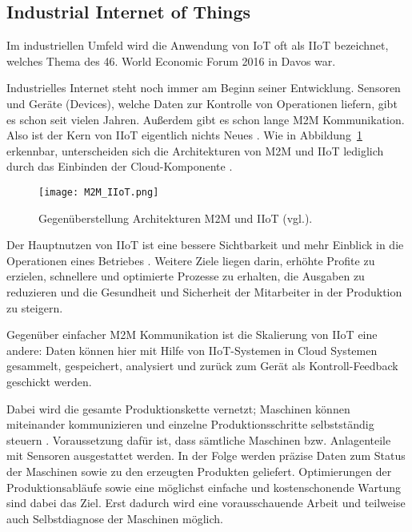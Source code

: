 \subsection{Industrial Internet of Things}
Im industriellen Umfeld wird die Anwendung von \acl{IoT} oft als \ac{IIoT} bezeichnet, welches Thema des 46. World Economic Forum 2016 in Davos war.

Industrielles Internet steht noch immer am Beginn seiner Entwicklung. Sensoren und Geräte (Devices), welche Daten zur Kontrolle von Operationen liefern, gibt es schon seit vielen Jahren. Außerdem gibt es schon lange \ac{M2M} Kommunikation. Also ist der Kern von \ac{IIoT} eigentlich nichts Neues \parencite{gilchrist2016industry}. Wie in Abbildung~\ref{fig:M2MIIoT} erkennbar, unterscheiden sich die Architekturen von \ac{M2M} und \ac{IIoT} lediglich durch das Einbinden der Cloud-Komponente \parencite{gilchrist2016industry}.

\begin{figure}%
\centering
\texttt{[image: M2M\_IIoT.png]} 
\caption{Gegenüberstellung Architekturen \ac{M2M} und \ac{IIoT} (vgl.\cite{gilchrist2016industry}).}
\label{fig:M2MIIoT}
\end{figure}

Der Hauptnutzen von \ac{IIoT} ist eine bessere Sichtbarkeit und mehr Einblick in die Operationen eines Betriebes \parencite{gilchrist2016industry}. Weitere Ziele liegen darin, erhöhte Profite zu erzielen, schnellere und optimierte Prozesse zu erhalten, die Ausgaben zu reduzieren und die Gesundheit und Sicherheit der Mitarbeiter in der Produktion zu steigern. 

Gegenüber einfacher \ac{M2M} Kommunikation ist die Skalierung von \ac{IIoT} eine andere: Daten können hier mit Hilfe von IIoT-Systemen in Cloud Systemen gesammelt, gespeichert, analysiert und zurück zum Gerät als Kontroll-Feedback geschickt werden. 

Dabei wird die gesamte Produktionskette vernetzt; Maschinen können miteinander kommunizieren und einzelne Produktionsschritte selbstständig steuern \parencite{andelfinger2014internet, gilchrist2016industry}. Voraussetzung dafür ist, dass sämtliche Maschinen bzw. Anlagenteile mit Sensoren ausgestattet werden. In der Folge werden präzise Daten zum Status der Maschinen sowie zu den erzeugten Produkten geliefert. Optimierungen der Produktionsabläufe sowie eine möglichst einfache und kostenschonende Wartung sind dabei das Ziel. Erst dadurch wird eine vorausschauende Arbeit und teilweise auch Selbstdiagnose der Maschinen möglich.

